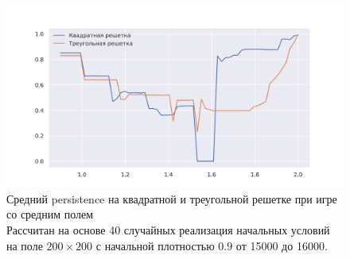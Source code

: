 \documentclass[12pt]{article}
\begin{document}
    \begin{figure}[!h]
        \centering
        \captionsetup{justification=centering}
        \includegraphics[width=\linewidth]{TriangularMeanFieldGame/persistence.png}
        \caption{Средний persistence на квадратной и треугольной решетке при игре со средним полем\\
        Рассчитан на основе 40 случайных реализация начальных условий на поле $200\times200$ с начальной плотностью $0.9$ от 15000 до 16000.\\
        }
        \label{fig:persistencemean}
    \end{figure}
    
\end{document}
